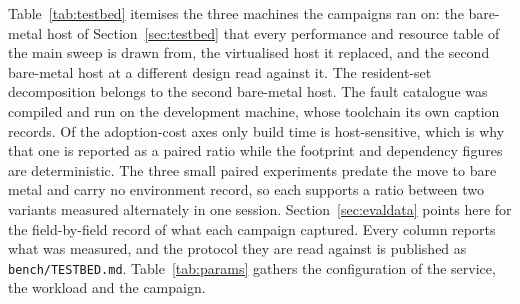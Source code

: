 \documentclass[english,oneside,a4paper,censored,csm,software-track-2020]{HYthesisML}
\begin{document}
\begin{appendices}
Table~\ref{tab:testbed} itemises the three machines the campaigns ran on: the bare-metal host of
Section~\ref{sec:testbed} that every performance and resource table of the main sweep is drawn from,
the virtualised host it replaced, and the second bare-metal host at a different design read
against it. The resident-set decomposition belongs to the
second bare-metal host. The fault catalogue was compiled and run on the development machine,
whose toolchain its own caption records. Of the adoption-cost axes only build time is
host-sensitive, which is why that one is reported as a paired ratio while the footprint and
dependency figures are deterministic. The three small paired experiments predate the move to
bare metal and carry no environment record, so each supports a ratio between two variants measured
alternately in one session. Section~\ref{sec:evaldata} points here for the field-by-field
record of what each campaign captured. Every column reports what was measured, and the protocol
they are read against is published as \texttt{bench/TESTBED.md}. Table~\ref{tab:params} gathers
the configuration of the service, the workload and the campaign.


\end{appendices}
\end{document}
